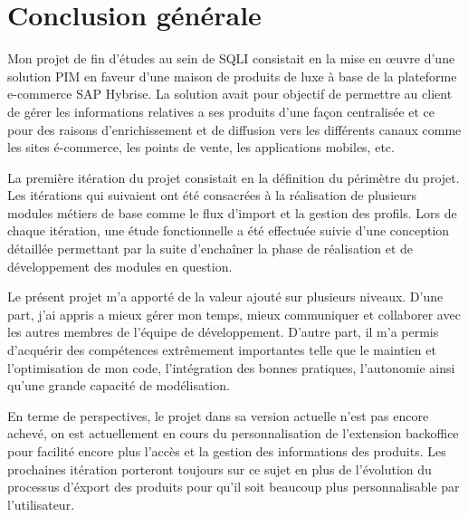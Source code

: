 \chapter*{Conclusion générale}
\label{sec:conclusion}

    Mon projet de fin d’études au sein de SQLI consistait en la mise en œuvre d’une solution PIM en faveur d’une maison de produits de luxe à base de la plateforme e-commerce SAP Hybrise. La solution avait pour objectif de permettre au client de gérer les informations relatives a ses produits d’une façon centralisée et ce pour des raisons d'enrichissement et de diffusion vers les différents canaux comme les sites é-commerce, les points de vente, les applications mobiles, etc.
    
    \medskip
    
    La première itération du projet consistait en la définition du périmètre du projet. Les itérations qui suivaient ont été consacrées à la réalisation de plusieurs modules métiers de base comme le flux d'import et la gestion des profils. Lors de chaque itération, une étude fonctionnelle a été effectuée suivie d’une conception détaillée permettant par la suite d’enchaîner la phase de réalisation et de développement des modules en question.

    \medskip
    
  Le présent projet m’a apporté de la valeur ajouté sur plusieurs niveaux. D’une part, j’ai appris a mieux gérer mon temps, mieux communiquer et collaborer avec les autres membres de l’équipe de développement. D’autre part, il m’a permis d’acquérir des compétences extrêmement importantes telle que le maintien et l'optimisation de mon code, l'intégration des bonnes pratiques, l’autonomie ainsi qu’une grande capacité de modélisation.
  
      \medskip

    En terme de perspectives, le projet dans sa version actuelle n’est pas encore achevé, on est actuellement en cours du personnalisation de l'extension backoffice pour facilité encore plus l'accès et la gestion des informations des produits. Les prochaines itération porteront toujours sur ce sujet en plus de l'évolution du processus d'éxport des produits pour qu'il soit beaucoup plus personnalisable par l'utilisateur.
    
        \medskip
    

    


